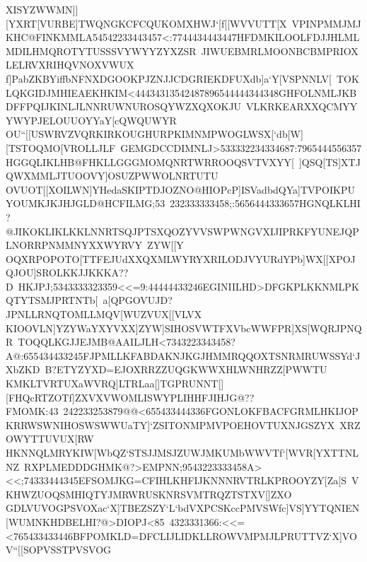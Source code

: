 {{ \hbox{XISYZWWMN]][YXRT[VURBE]TWQNGKCFCQUKOMXHWJ`[f[[WVVUTT[X%
 VPINPMMJMJKHC@FINKMMLA54542233443457<:7744434443447HFDMKILOOLFDJJHLMLMDILHMQROTYTUSSSVYWYYZYXZSR%
 JIWUEBMRLMOONBCBMPRIOXLELRVXRIHQVNOXVWUX}
 \hbox{f]PabZKBYiffbNFNXDGOOKPJZNJJCDGRIEKDFUXdb]a`Y[VSPNNLV[%
 TOKLQKGIDJMHIEAEKHKIM<44434313542487896544444344348GHFOLNMLJKBDFFPQIJKINLJLNNRUWNUROSQYWZXQXOKJU%
 VLKRKEARXXQCMYYYWYPJELOUUOYYaY[cQWQUWYR}
 \hbox{OU``[[USWRVZVQRKIRKOUGHURPKIMNMPWOGLWSX[`db[W][TSTOQMO[VROLLJLF%
 GEMGDCCDIMNLJ>533332234334687:7965444556357HGGQLIKLHB@FHKLLGGGMOMQNRTWRROOQSVTVXYY[%
 ]QSQ[TS]XTJQWXMMLJTUOOVY]OSUZPWWOLNRTUTU}
 \hbox{OVUOT[[XOILWN]YHedaSKIPTDJOZNO@HIOPcP]ISVadbdQYa]TVPOIKPUYOUMKJKJHJGLD@HCFILMG;53%
 232333333458;:5656444333657HGNQLKLHI?@JIKOKLIKLKKLNNRTSQJPTSXQOZYVVSWPWNGVXIJIPRKFYUNEJQPLNORRPNMMNYXXWYRVY%
 ZYW[[Y}
 \hbox{OQXRPOPOTO[TTFEJUdXXQXMLWYRYXRILODJVYURdYPb]WX[[XPOJQJOU]SROLKKJJKKKA??D%
 HKJPJ;5343333323359<<=9:44444433246EGINIILHD>DFGKPLKKNMLPKQTYTSMJPRTNTb[%
 a[QPGOVUJD?JPNLLRNQTOMLLMQV[WUZVUX[[VLVX}
 \hbox{KIOOVLN]YZYWaYXYVXX]ZYW]SIHOSVWTFXVbcWWFPR]XS[WQRJPNQR%
 TOQQLKGJJEJMB@AAILJLH<7343223343458?A@:655434433245FJPMLLKFABDAKNJKGJHMMRQQOXTSNRMRUWSSYd`JXbZKD%
 B?ETYZYXD=EJOXRRZZUQGKWWXHLWNHRZZ[PWWTU}
 \hbox{KMKLTVRTUXaWVRQ]LTRLaa[]TGPRUNNT[][FHQcRTZOTf]ZXVXVWOMLISWYPLIHHFJIHJG@??FMOMK:43%
 242233253879@@<655433444336FGONLOKFBACFGRMLHKIJOPKRRWSWNIHOSWSWWUaTY]`ZSITONMPMVPOEHOVTUXNJGSZYX%
 XRZOWYTTUVUX[RW}
 \hbox{HKNNQLMRYKIW[WbQZ`STSJJMSJZUWJMKUMbWWVTf`[WVR[YXTTNLNZ%
 RXPLMEDDDGHMK@?>EMPNN;9543223333458A><<;74333444345EFSOMJKG=CFIHLKHFIJKNNNRVTRLKPROOYZY[Za[S%
 VKHWZUOQSMHIQTYJMRWRUSKNRSVMTRQZTSTXV[]ZXO}
 \hbox{GDLVUVOGPSVOXac`X]TBEZSZY`L`bdVXPCSKccPMVSWfc]VS]YYTQNIEN[WUMNKHDBELHI?@>DIOPJ<85%
 4323331366:<<=<765433433446BFPOMKLD=DFCLIJLIDKLLROWVMPMJLPRUTTVZ`X]VOV``[[SOPVSSTPVSVOG%
}}}
